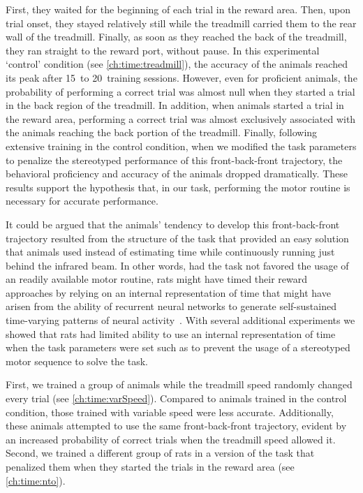 First, they waited for the beginning of each trial in the reward area.
Then, upon trial onset, they stayed relatively still while the treadmill carried them to the rear wall of the treadmill.
Finally, as soon as they reached the back of the treadmill, they ran straight to the reward port, without pause.
In this experimental `control' condition (see \autoref{ch:time:treadmill}), the accuracy of the animals reached its peak after 15~to 20~training sessions.
However, even for proficient animals, the probability of performing a correct trial was almost null when they started a trial in the back region of the treadmill.
In addition, when animals started a trial in the reward area, performing a correct trial was almost exclusively associated with the animals reaching the back portion of the treadmill.
Finally, following extensive training in the control condition, when we modified the task parameters to penalize the stereotyped performance of this front-back-front trajectory, the behavioral proficiency and accuracy of the animals dropped dramatically.
These results support the hypothesis that, in our task, performing the motor routine is necessary for accurate performance.
\par
It could be argued that the animals' tendency to develop this front-back-front trajectory resulted from the structure of the task that provided an easy solution that animals used instead of estimating time while continuously running just behind the infrared beam.
In other words, had the task not favored the usage of an readily available motor routine, rats might have timed their reward approaches by relying on an internal representation of time that might have arisen from the ability of recurrent neural networks to generate self-sustained time-varying patterns of neural activity~\cite{Buonomano2011chapter}.
With several additional experiments we showed that rats had limited ability to use an internal representation of time when the task parameters were set such as to prevent the usage of a stereotyped motor sequence to solve the task.
\par
First, we trained a group of animals while the treadmill speed randomly changed every trial (see \autoref{ch:time:varSpeed}).
Compared to animals trained in the control condition, those trained with variable speed were less accurate.
Additionally, these animals attempted to use the same front-back-front trajectory, evident by an increased probability of correct trials when the treadmill speed allowed it.
Second, we trained a different group of rats in a version of the task that penalized them when they started the trials in the reward area (see \autoref{ch:time:nto}).
